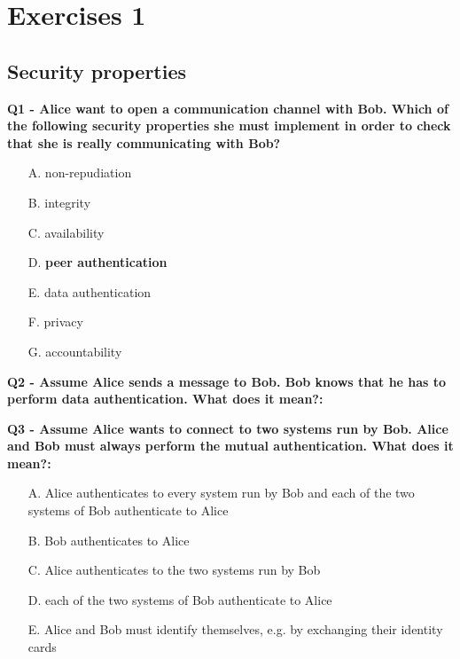 \chapter{Exercises 1}

\section{Security properties}

\textbf{Q1 - Alice want to open a communication channel with Bob. Which of the following 
security properties she must implement in order to check that she is really communicating with Bob?}
\begin{enumerate}
\item[A.] non-repudiation
\item[B.] integrity
\item[C.] availability
\item[D.] \textbf{peer authentication}
\item[E.] data authentication
\item[F.] privacy
\item[G.] accountability

\end{enumerate}


\textbf{Q2 - Assume Alice sends a message to Bob. Bob knows that he
has to perform data authentication. What does it mean?:}

\textbf{Q3 - Assume Alice wants to connect to two systems run by Bob. Alice and Bob must always perform the mutual authentication. What does it mean?:}
\begin{enumerate}
    \item[A.] Alice authenticates to every system run by Bob and each of the two systems of Bob authenticate to Alice
    \item[B.] Bob authenticates to Alice
    \item[C.] Alice authenticates to the two systems run by Bob
    \item[D.] each of the two systems of Bob authenticate to Alice
    \item[E.] Alice and Bob must identify themselves, e.g. by exchanging their identity cards
\end{enumerate}

